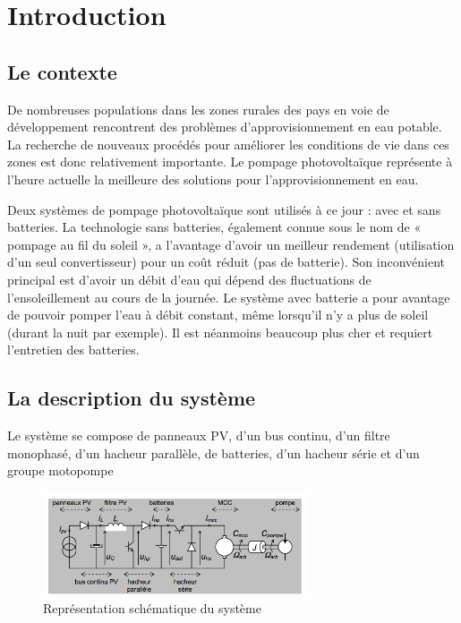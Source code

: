 \section{Introduction}
\subsection{Le contexte}

De nombreuses populations dans les zones rurales des pays en voie de développement rencontrent des problèmes d’approvisionnement en eau potable. La recherche de nouveaux procédés pour améliorer les conditions de vie dans ces zones est donc relativement importante. Le pompage photovoltaïque représente à l’heure actuelle la meilleure des solutions pour l’approvisionnement en eau.

Deux systèmes de pompage photovoltaïque sont utilisés à ce jour : avec et sans batteries. La technologie sans batteries, également connue sous le nom de « pompage au fil du soleil », a l’avantage d’avoir un meilleur rendement (utilisation d’un seul convertisseur) pour un coût réduit (pas de batterie). Son inconvénient principal est d’avoir un débit d’eau qui dépend des fluctuations de l’ensoleillement au cours de la journée. Le système avec batterie a pour avantage de pouvoir pomper l’eau à débit constant, même lorsqu’il n’y a plus de soleil (durant la nuit par exemple). Il est néanmoins beaucoup plus cher et requiert l’entretien des batteries.


\subsection{La description du système}

Le système se compose de panneaux PV, d’un bus continu, d’un filtre monophasé, d’un hacheur parallèle, de batteries, d’un hacheur série et d’un groupe motopompe 

\begin{figure}[ht]
	\begin{center}
	\includegraphics[width=0.7\textwidth]{images/Systeme.png}
	\caption{Représentation schématique du système}\label{img:Schéma système EnRE}
	\end{center}
\end{figure}
\FloatBarrier 


